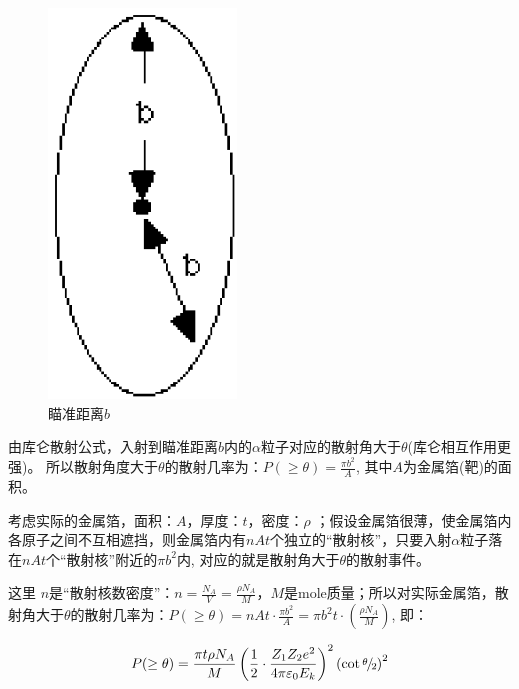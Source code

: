 \begin{figure}[h]
\begin{center}
\includegraphics[clip,width=5cm]{AtomIdea/1-6.eps}
\caption{瞄准距离$b$}
\end{center}
\end{figure}


由库仑散射公式，入射到瞄准距离$b$内的$\alpha
$粒子对应的散射角大于$\theta $(库仑相互作用更强)。
所以散射角度大于$\theta $的散射几率为：$P( \ge \theta ) =
\frac{{\pi b^2 }}{A}$, 其中$A$为金属箔(靶)的面积。

考虑实际的金属箔，面积：$A$，厚度：$t$，密度：$\rho $
；假设金属箔很薄，使金属箔内各原子之间不互相遮挡，则金属箔内有$nAt
$个独立的``散射核''，只要入射$\alpha$粒子落在$nAt
$个``散射核''附近的$\pi b^2$内,
对应的就是散射角大于$\theta$的散射事件。

这里 $n$是``散射核数密度''：$n = \frac{{N_A }}{V} = \frac{{\rho N_A
}}{M}$，$M$是mole质量；所以对实际金属箔，散射角大于$\theta
$的散射几率为：$P( \ge \theta ) = nAt \cdot \frac{{\pi b^2 }}{A} =
\pi b^2 t \cdot \left( {\frac{{\rho N_A }}{M}} \right)$, 即：


\begin{equation}
\label{theta}
P( \ge \theta ) = \frac{{\pi t\rho N_A }}{M}\left(
{\frac{1}{2} \cdot \frac{{Z_1 Z_2 e^2 }}{{4\pi \varepsilon _0 E_k
}}} \right)^2 \left( {\cot {\raise0.5ex\hbox{$\scriptstyle \theta
$} \kern-0.1em/\kern-0.15em \lower0.25ex\hbox{$\scriptstyle 2$}}}
\right)^2
\end{equation}


